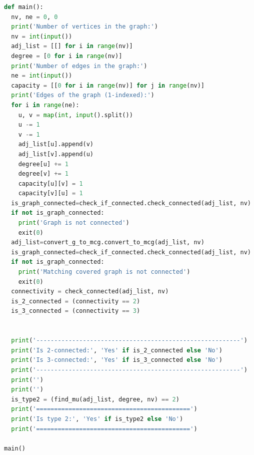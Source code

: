 \documentclass[11pt]{article}
\begin{document}
\begin{lstlisting}[language=Python]
def main():
  nv, ne = 0, 0
  print('Number of vertices in the graph:')
  nv = int(input())
  adj_list = [[] for i in range(nv)]
  degree = [0 for i in range(nv)]
  print('Number of edges in the graph:')
  ne = int(input())
  capacity = [[0 for i in range(nv)] for j in range(nv)]
  print('Edges of the graph (1-indexed):')
  for i in range(ne):
    u, v = map(int, input().split())
    u -= 1
    v -= 1
    adj_list[u].append(v)
    adj_list[v].append(u)   
    degree[u] += 1
    degree[v] += 1
    capacity[u][v] = 1
    capacity[v][u] = 1
  is_graph_connected=check_if_connected.check_connected(adj_list, nv)
  if not is_graph_connected:
    print('Graph is not connected')
    exit(0)
  adj_list=convert_g_to_mcg.convert_to_mcg(adj_list, nv)
  is_graph_connected=check_if_connected.check_connected(adj_list, nv)
  if not is_graph_connected:
    print('Matching covered graph is not connected')
    exit(0)
  connectivity = check_connected(adj_list, nv)
  is_2_connected = (connectivity == 2)
  is_3_connected = (connectivity == 3)


  print('---------------------------------------------------------')
  print('Is 2-connected:', 'Yes' if is_2_connected else 'No')
  print('Is 3-connected:', 'Yes' if is_3_connected else 'No')
  print('---------------------------------------------------------')
  print('')
  print('')
  is_type2 = (find_mu(adj_list, degree, nv) == 2)
  print('===========================================')
  print('Is type 2:', 'Yes' if is_type2 else 'No')
  print('===========================================')

main()
\end{lstlisting}
\end{document}
